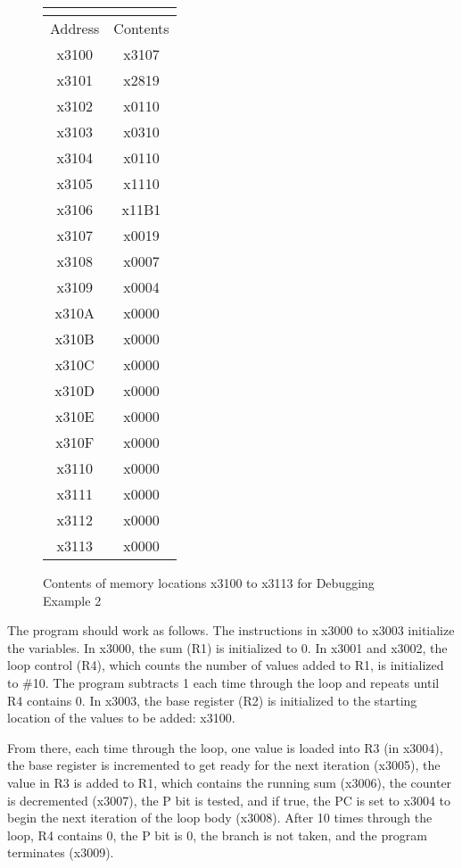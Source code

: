 \documentclass{patt}
\begin{document}
\begin{figure}[p]
\begin{center}
\small
\begin{tabular}{@{}| c | c |}
\multicolumn{2}{c}{}\\[4pt]\hline
Address& Contents \\
\hline
x3100 &  x3107\\
x3101 &  x2819\\
x3102 &  x0110\\
x3103 &  x0310\\
x3104 &  x0110\\
x3105 &  x1110\\
x3106 &  x11B1\\
x3107 &  x0019\\
x3108 &  x0007\\
x3109 &  x0004\\
x310A &  x0000\\
x310B &  x0000\\
x310C &  x0000\\
x310D &  x0000\\
x310E &  x0000\\
x310F &  x0000\\
x3110 &  x0000\\
x3111 &  x0000\\
x3112 &  x0000\\
x3113 &  x0000\\
\hline
\end{tabular}
\end{center}
\caption{Contents of memory locations x3100 to x3113 for
Debugging Example 2}
\vspace{50pt}
\end{figure}

\FloatBarrier
The program should work as follows.  The instructions in x3000 to
x3003 initialize the variables.  In x3000, the sum (R1) is
initialized to 0. In x3001 and x3002, the loop control (R4),
which counts the number of values added to R1, is initialized
to \#10.  The program subtracts 1 each time through the loop and
repeats until R4 contains 0.  In x3003, the base register (R2) is
initialized to the starting location of the values to be added:
x3100.

From there, each time through the loop, one value is loaded into
R3 (in x3004), the base register is incremented to get ready for
the next iteration (x3005), the value in R3 is added to R1, which
contains the running sum (x3006), the counter is decremented (x3007),
the P bit is tested, and if true, the PC is set to x3004 to begin
the next iteration of the loop body (x3008).  After 10 times through 
the loop, R4 contains 0, the P bit is 0, the branch is not taken, and 
the program terminates (x3009).
\end{document}
